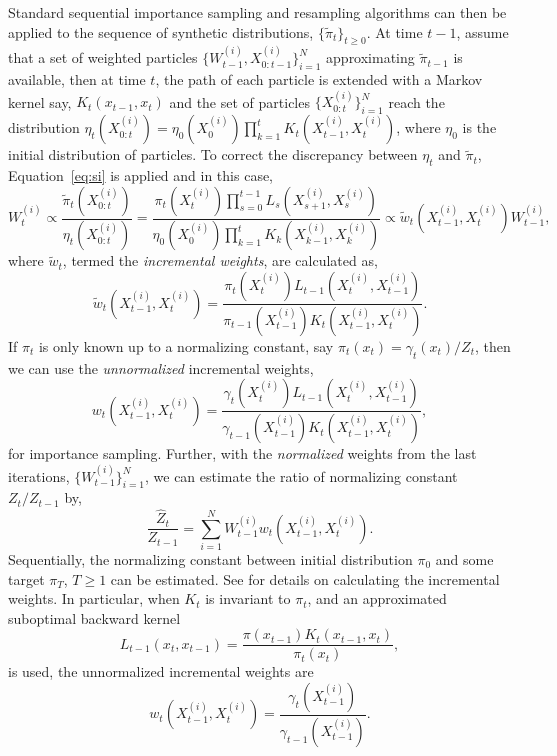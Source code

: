 \documentclass[11pt, bib, hyper, mint, minted=cache]{marticle}
\begin{document}
Standard sequential importance sampling and resampling algorithms can then be
applied to the sequence of synthetic distributions, $\{\tilde\pi_t\}_{t\ge0}$.
At time $t - 1$, assume that a set of weighted particles
$\{W_{t-1}^{(i)},X_{0:t-1}^{(i)}\}_{i=1}^N$ approximating $\tilde\pi_{t-1}$ is
available, then at time $t$, the path of each particle is extended with a
Markov kernel say, $K_t(x_{t-1}, x_t)$ and the set of particles
$\{X_{0:t}^{(i)}\}_{i=1}^N$ reach the distribution $\eta_t(X_{0:t}^{(i)}) =
\eta_0(X_0^{(i)})\prod_{k=1}^tK_t(X_{t-1}^{(i)}, X_t^{(i)})$, where $\eta_0$
is the initial distribution of particles. To correct the discrepancy between
$\eta_t$ and $\tilde\pi_t$, Equation~\ref{eq:si} is applied and in this case,
\begin{equation}
  W_t^{(i)} \propto \frac{\tilde\pi_t(X_{0:t}^{(i)})}{\eta_t(X_{0:t}^{(i)})}
  = \frac{\pi_t(X_t^{(i)})\prod_{s=0}^{t-1}L_s(X_{s+1}^{(i)}, X_s^{(i)})}
  {\eta_0(X_0^{(i)})\prod_{k=1}^tK_k(X_{k-1}^{(i)},X_k^{(i)})}
  \propto \tilde{w}_t(X_{t-1}^{(i)}, X_t^{(i)})W_{t-1}^{(i)},
\end{equation}
where $\tilde{w}_t$, termed the \emph{incremental weights}, are calculated as,
\begin{equation}
  \tilde{w}_t(X_{t-1}^{(i)},X_t^{(i)}) =
  \frac{\pi_t(X_t^{(i)})L_{t-1}(X_t^{(i)}, X_{t-1}^{(i)})}
  {\pi_{t-1}(X_{t-1}^{(i)})K_t(X_{t-1}^{(i)}, X_t^{(i)})}.
\end{equation}
If $\pi_t$ is only known up to a normalizing constant, say $\pi_t(x_t) =
\gamma_t(x_t)/Z_t$, then we can use the \emph{unnormalized} incremental
weights,
\begin{equation}
  w_t(X_{t-1}^{(i)},X_t^{(i)}) =
  \frac{\gamma_t(X_t^{(i)})L_{t-1}(X_t^{(i)}, X_{t-1}^{(i)})}
  {\gamma_{t-1}(X_{t-1}^{(i)})K_t(X_{t-1}^{(i)}, X_t^{(i)})},
\end{equation}
for importance sampling. Further, with the \emph{normalized} weights from the
last iterations, $\{W_{t-1}^{(i)}\}_{i=1}^N$, we can estimate the ratio of
normalizing constant $Z_t/Z_{t-1}$ by,
\begin{equation}
  \frac{\hat{Z}_t}{Z_{t-1}} =
  \sum_{i=1}^N W_{t-1}^{(i)}w_t(X_{t-1}^{(i)},X_t^{(i)}).
\end{equation}
Sequentially, the normalizing constant between initial distribution $\pi_0$
and some target $\pi_T$, $T\ge1$ can be estimated. See
\textcite{DelMoral:2006hc} for details on  calculating the incremental
weights. In particular, when $K_t$ is invariant to $\pi_t$, and an
approximated suboptimal backward kernel
\begin{equation}
  L_{t-1}(x_t, x_{t-1}) = \frac{\pi(x_{t-1})K_t(x_{t-1}, x_t)}{\pi_t(x_t)},
\end{equation}
is used, the unnormalized incremental weights are
\begin{equation}
  w_t(X_{t-1}^{(i)},X_t^{(i)}) =
  \frac{\gamma_t(X_{t-1}^{(i)})}{\gamma_{t-1}(X_{t-1}^{(i)})}.
  \label{eq:inc_weight_mcmc}
\end{equation}
\end{document}
